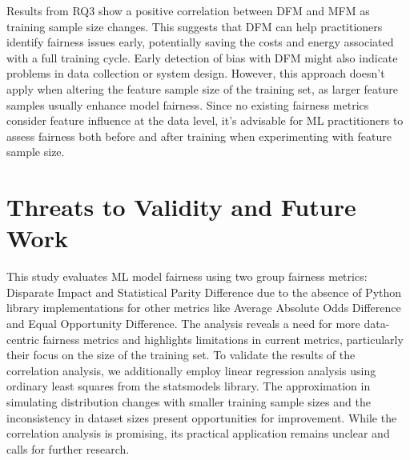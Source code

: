 \documentclass[sigconf]{acmart}
\begin{document}
Results from RQ3 show a positive correlation between DFM and MFM as
training sample size changes. This suggests that DFM can help
practitioners identify fairness issues early, potentially saving the
costs and energy associated with a full training cycle. Early
detection of bias with DFM might also indicate problems in data
collection or system design. However, this approach doesn't apply when
altering the feature sample size of the training set, as larger
feature samples usually enhance model fairness. Since no existing
fairness metrics consider feature influence at the data level, it's
advisable for ML practitioners to assess fairness both before and
after training when experimenting with feature sample size.



\section{Threats to Validity and Future Work}\label{sec:threats}

This study evaluates ML model fairness using two group fairness
metrics: Disparate Impact and Statistical Parity Difference due to the
absence of Python library implementations for other metrics like
Average Absolute Odds Difference and Equal Opportunity Difference. The
analysis reveals a need for more data-centric fairness metrics and
highlights limitations in current metrics, particularly their focus on
the size of the training set. To validate the results of the
correlation analysis, we additionally employ linear regression
analysis using ordinary least squares from the statsmodels library.
The approximation in simulating distribution changes with smaller
training sample sizes and the inconsistency in dataset sizes present
opportunities for improvement. While the correlation analysis is
promising, its practical application remains unclear and calls for
further research.
\end{document}
